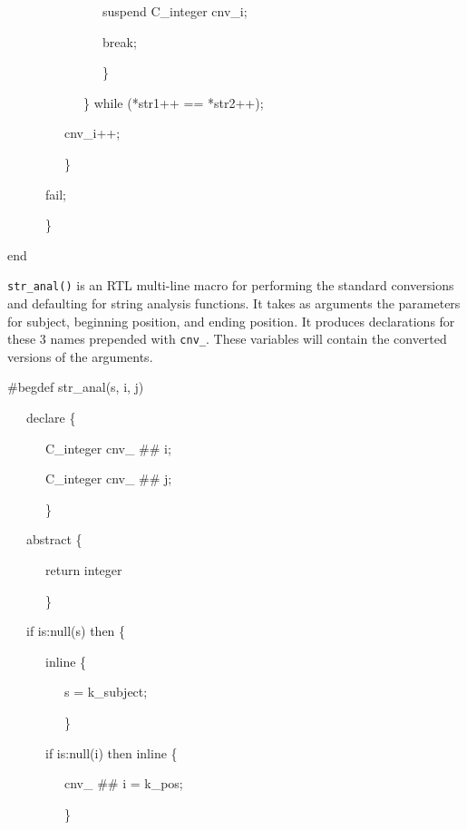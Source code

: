 {\ttfamily\mdseries
\ \ \ \ \ \ \ \ \ \ \ \ \ \ \ suspend C\_integer cnv\_i;}

{\ttfamily\mdseries
\ \ \ \ \ \ \ \ \ \ \ \ \ \ \ break;}

{\ttfamily\mdseries
\ \ \ \ \ \ \ \ \ \ \ \ \ \ \ \}}

{\ttfamily\mdseries
\ \ \ \ \ \ \ \ \ \ \ \ \} while (*str1++ == *str2++);}

{\ttfamily\mdseries
\ \ \ \ \ \ \ \ \ cnv\_i++;}

{\ttfamily\mdseries
\ \ \ \ \ \ \ \ \ \}}

{\ttfamily\mdseries
\ \ \ \ \ \ fail;}

{\ttfamily\mdseries
\ \ \ \ \ \ \}}

{\ttfamily\mdseries
end}

\texttt{str\_anal()} is an RTL multi-line macro for performing the
standard conversions and defaulting for string analysis functions. It
takes as arguments the parameters for subject, beginning position, and
ending position. It produces declarations for these 3 names prepended
with \texttt{cnv\_}. These variables will contain the converted
versions of the arguments.

{\ttfamily\mdseries
\#begdef str\_anal(s, i, j)}

{\ttfamily\mdseries
\ \ \ declare \{}

{\ttfamily\mdseries
\ \ \ \ \ \ C\_integer cnv\_ \#\# i;}

{\ttfamily\mdseries
\ \ \ \ \ \ C\_integer cnv\_ \#\# j;}

{\ttfamily\mdseries
\ \ \ \ \ \ \}}


\bigskip

{\ttfamily\mdseries
\ \ \ abstract \{}

{\ttfamily\mdseries
\ \ \ \ \ \ return integer}

{\ttfamily\mdseries
\ \ \ \ \ \ \}}


\bigskip

{\ttfamily\mdseries
\ \ \ if is:null(s) then \{}

{\ttfamily\mdseries
\ \ \ \ \ \ inline \{}

{\ttfamily\mdseries
\ \ \ \ \ \ \ \ \ s = k\_subject;}

{\ttfamily\mdseries
\ \ \ \ \ \ \ \ \ \}}

{\ttfamily\mdseries
\ \ \ \ \ \ if is:null(i) then inline \{}

{\ttfamily\mdseries
\ \ \ \ \ \ \ \ \ cnv\_ \#\# i = k\_pos;}

{\ttfamily\mdseries
\ \ \ \ \ \ \ \ \ \}}

